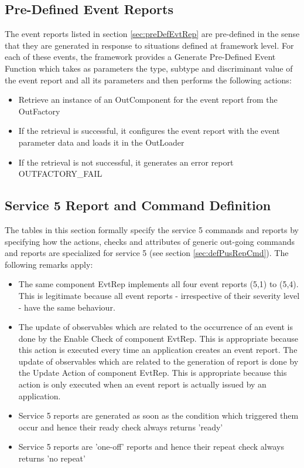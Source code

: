 \documentclass{pnp_article}
\begin{document}
\subsection{Pre-Defined Event Reports}\label{sec:serv5PreDefEvtRep}
The event reports listed in section \ref{sec:preDefEvtRep} are pre-defined in the sense that they are generated in response to situations defined at framework level. For each of these events, the framework provides a Generate Pre-Defined Event Function which takes as parameters the type, subtype and discriminant value of the event report and all its parameters and then performs the following actions:

\begin{itemize}
\item Retrieve an instance of an OutComponent for the event report from the OutFactory
\item If the retrieval is successful, it configures the event report with the event parameter data and loads it in the OutLoader
\item If the retrieval is not successful, it generates an error report OUTFACTORY\_FAIL
\end{itemize}


\subsection{Service 5 Report and Command Definition}\label{sec:serv5RepCmdDef}
The tables in this section formally specify the service 5 commands and reports by specifying how the actions, checks and attributes of generic out-going commands and reports are specialized for service 5 (see section \ref{sec:defPusRepCmd}). The following remarks apply:

\begin{itemize}
\item The same component EvtRep implements all four event reports (5,1) to (5,4). This is legitimate because all event reports - irrespective of their severity level - have the same behaviour. 
\item The update of observables which are related to the occurrence of an event is done by the Enable Check of component EvtRep. This is appropriate because this action is executed every time an application creates an event report. The update of observables which are related to the generation of report is done by the Update Action of component EvtRep. This is appropriate because this action is only executed when an event report is actually issued by an application.
\item Service 5 reports are generated as soon as the condition which triggered them occur and hence their ready check always returns 'ready'
\item Service 5 reports are 'one-off' reports and hence their repeat check always returns 'no repeat'
\end{itemize}
\end{document}
